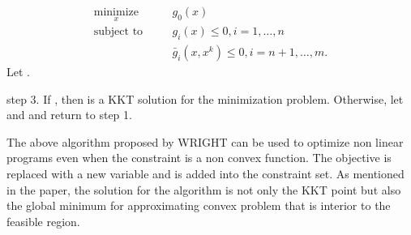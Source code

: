\begin{eqnarray}
\underset{x}{\text{minimize}} \quad && g_0(x) \\
\text{subject to} \quad && g_i(x) \leq 0, i = 1,\dotsc,n\\
&& \bar{g}_i(x,x^k) \leq 0, i = n + 1,\dotsc,m.
\end{eqnarray} 
Let .\\
\par
step 3. If , then  is a \ac{KKT} solution for the minimization problem. Otherwise, let  and  and return to step 1.\\
\par
The above algorithm proposed by WRIGHT can be used to optimize non linear programs even when the constraint is a non convex function. The objective is replaced with a new variable and is added into the constraint set. As mentioned in the paper, the solution for the algorithm is not only the \ac{KKT} point but also the global minimum for approximating convex problem that is interior to the feasible region.

